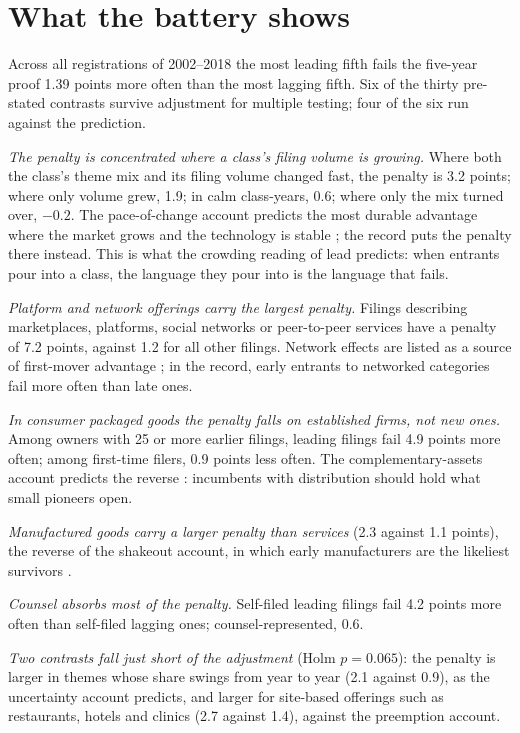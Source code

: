 \section*{What the battery shows}

Across all registrations of 2002--2018 the most leading fifth fails the
five-year proof 1.39 points more often than the most lagging fifth. Six
of the thirty pre-stated contrasts survive adjustment for multiple
testing; four of the six run against the prediction.

\emph{The penalty is concentrated where a class's filing volume is
growing.} Where both the class's theme mix and its filing volume changed
fast, the penalty is 3.2 points; where only volume grew, 1.9; in calm
class-years, 0.6; where only the mix turned over, $-0.2$. The pace-of-change
account predicts the most durable advantage where the market grows and the
technology is stable \citep{SuarezLanzolla2007}; the record puts the
penalty there instead. This is what the crowding reading of lead
predicts: when entrants pour into a class, the language they pour into is
the language that fails.

\emph{Platform and network offerings carry the largest penalty.} Filings
describing marketplaces, platforms, social networks or peer-to-peer
services have a penalty of 7.2 points, against 1.2 for all other filings.
Network effects are listed as a source of first-mover advantage
\citep{LiebermanMontgomery1988}; in the record, early entrants to
networked categories fail more often than late ones.

\emph{In consumer packaged goods the penalty falls on established firms,
not new ones.} Among owners with 25 or more earlier filings, leading
filings fail 4.9 points more often; among first-time filers, 0.9 points
less often. The complementary-assets account predicts the reverse
\citep{Teece1986}: incumbents with distribution should hold what small
pioneers open.

\emph{Manufactured goods carry a larger penalty than services} (2.3
against 1.1 points), the reverse of the shakeout account, in which early
manufacturers are the likeliest survivors \citep{KlepperMiller1995,
Klepper1997}.

\emph{Counsel absorbs most of the penalty.} Self-filed leading filings
fail 4.2 points more often than self-filed lagging ones; counsel-represented,
0.6.

\emph{Two contrasts fall just short of the adjustment} (Holm $p = 0.065$):
the penalty is larger in themes whose share swings from year to year (2.1
against 0.9), as the uncertainty account predicts, and larger for
site-based offerings such as restaurants, hotels and clinics (2.7 against
1.4), against the preemption account.

